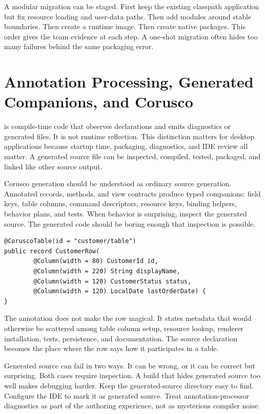 A modular migration can be staged. First keep the existing classpath application but fix resource loading and user-data paths. Then add modules around stable boundaries. Then create a runtime image. Then create native packages. This order gives the team evidence at each step. A one-shot migration often hides too many failures behind the same packaging error.

\section{Annotation Processing, Generated Companions, and Corusco}

 is compile-time code that observes declarations and emits diagnostics or generated files. It is not runtime reflection. This distinction matters for desktop applications because startup time, packaging, diagnostics, and IDE review all matter. A generated source file can be inspected, compiled, tested, packaged, and linked like other source output.

Corusco generation should be understood as ordinary source generation. Annotated records, methods, and view contracts produce typed companions: field keys, table columns, command descriptors, resource keys, binding helpers, behavior plans, and tests. When behavior is surprising, inspect the generated source. The generated code should be boring enough that inspection is possible.

\begin{lstlisting}[caption={The kind of source declaration generation can consume.}]
@CoruscoTable(id = "customer/table")
public record CustomerRow(
        @Column(width = 80) CustomerId id,
        @Column(width = 220) String displayName,
        @Column(width = 120) CustomerStatus status,
        @Column(width = 120) LocalDate lastOrderDate) {
}
\end{lstlisting}

The annotation does not make the row magical. It states metadata that would otherwise be scattered among table column setup, resource lookup, renderer installation, tests, persistence, and documentation. The source declaration becomes the place where the row says how it participates in a table.

Generated source can fail in two ways. It can be wrong, or it can be correct but surprising. Both cases require inspection. A build that hides generated source too well makes debugging harder. Keep the generated-source directory easy to find. Configure the IDE to mark it as generated source. Treat annotation-processor diagnostics as part of the authoring experience, not as mysterious compiler noise.

